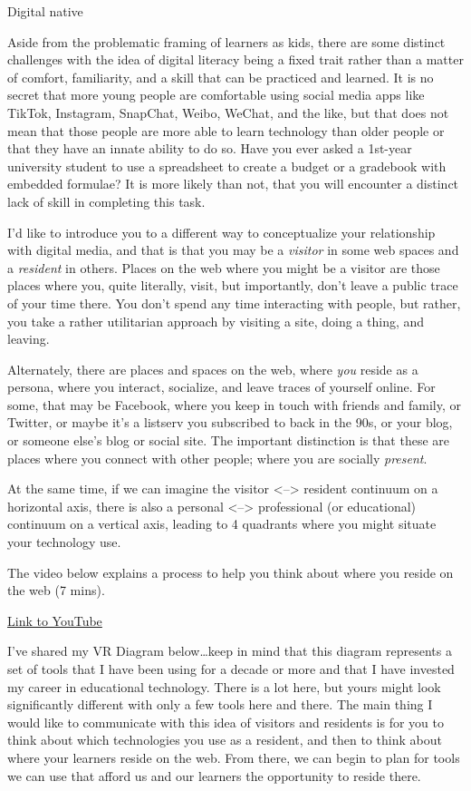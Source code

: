 \documentclass[
]{book}
\begin{document}
Digital native

Aside from the problematic framing of learners as kids, there are some distinct challenges with the idea of digital literacy being a fixed trait rather than a matter of comfort, familiarity, and a skill that can be practiced and learned. It is no secret that more young people are comfortable using social media apps like TikTok, Instagram, SnapChat, Weibo, WeChat, and the like, but that does not mean that those people are more able to learn technology than older people or that they have an innate ability to do so. Have you ever asked a 1st-year university student to use a spreadsheet to create a budget or a gradebook with embedded formulae? It is more likely than not, that you will encounter a distinct lack of skill in completing this task.

I'd like to introduce you to a different way to conceptualize your relationship with digital media, and that is that you may be a \emph{visitor} in some web spaces and a \emph{resident} in others. Places on the web where you might be a visitor are those places where you, quite literally, visit, but importantly, don't leave a public trace of your time there. You don't spend any time interacting with people, but rather, you take a rather utilitarian approach by visiting a site, doing a thing, and leaving.

Alternately, there are places and spaces on the web, where \emph{you} reside as a persona, where you interact, socialize, and leave traces of yourself online. For some, that may be Facebook, where you keep in touch with friends and family, or Twitter, or maybe it's a listserv you subscribed to back in the 90s, or your blog, or someone else's blog or social site. The important distinction is that these are places where you connect with other people; where you are socially \emph{present}.

At the same time, if we can imagine the visitor \textless--\textgreater{} resident continuum on a horizontal axis, there is also a personal \textless--\textgreater{} professional (or educational) continuum on a vertical axis, leading to 4 quadrants where you might situate your technology use.

The video below explains a process to help you think about where you reside on the web (7 mins).

\href{https://www.youtube.com/watch?v=sPOG3iThmRI}{Link to YouTube}

I've shared my VR Diagram below\ldots keep in mind that this diagram represents a set of tools that I have been using for a decade or more and that I have invested my career in educational technology. There is a lot here, but yours might look significantly different with only a few tools here and there. The main thing I would like to communicate with this idea of visitors and residents is for you to think about which technologies you use as a resident, and then to think about where your learners reside on the web. From there, we can begin to plan for tools we can use that afford us and our learners the opportunity to reside there.
\end{document}
